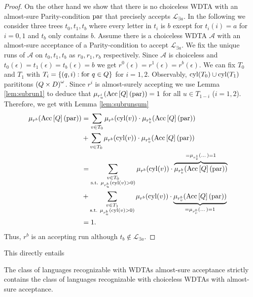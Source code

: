 \begin{proof}
  On the other hand we show that there is no choiceless \ac{WDTA} with an
  almost-sure Parity-condition $\operatorname{par}$ that precisely accepts 
  $\mathcal{L}_{\exists a}$. In the following we consider three trees 
  $t_{0}, t_{1}, t_{b}$ where every letter in $t_{i}$ is $b$ except for 
  $t_{i}(i) = a$ for $i = 0,1$ and $t_{b}$ only contains $b$. Assume there is a 
  choiceless \ac{WDTA} $\mathcal{A}$ with an almost-sure acceptance of a 
  Parity-condition to accept $\mathcal{L}_{\exists a}$. We fix the unique runs 
  of $\mathcal{A}$ on $t_{0},t_{1}, t_{b}$ as $r_{0}, r_{1}, r_{b}$ 
  respectively. Since $\mathcal{A}$ is choiceless and 
  $t_{0}(\epsilon) = t_{1}(\epsilon) = t_{b}(\epsilon) = b$ we get 
  $r^{0}(\epsilon) = r^{1}(\epsilon) = r^{b}(\epsilon)$. We can fix
  $T_{0}$ and $T_{1}$ with $T_{i} = \left\{\left(q, i\right):\text{for }q\in Q\right\}$ 
  for $i = 1,2$. Observably, $\operatorname{cyl}(T_{0})\cup\operatorname{cyl}(T_{1})$ parititons 
  $\left(Q\times D\right)^{\omega}$. Since $r^{i}$ is almost-surely accepting we use
  Lemma \ref{lem:subrun1} to deduce that 
  $\mu_{r^{i}_{u}}(\operatorname{Acc}\left[Q\right](\operatorname{par})) = 1$ for all $u\in T_{1-i}$ 
  ($i = 1,2$). Therefore, we get with Lemma \ref{lem:subrunsum}
  \begin{align*}
    \mu_{r^{b}}(\operatorname{Acc}\left[Q\right](\operatorname{par})) &= \sum_{v\in T_{0}}
      \mu_{r^{b}}(\operatorname{cyl}(v))\cdot\mu_{r^{b}_{v}}(\operatorname{Acc}\left[Q\right](\operatorname{par}))\\
    &+ \sum_{v\in T_{0}}
      \mu_{r^{b}}(\operatorname{cyl}(v))\cdot\mu_{r^{b}_{v}}(\operatorname{Acc}\left[Q\right](\operatorname{par}))\\
    &= \sum_{\substack{v\in T_{0}\\\text{s.t. }\mu_{r^{b}_{u}}(\operatorname{cyl}(v)>0)}}
      \mu_{r^{b}}(\operatorname{cyl}(v))\cdot\overbrace{\mu_{r^{b}_{v}}(
        \operatorname{Acc}\left[Q\right](\operatorname{par}))}^{=\mu_{r^{1}_{v}}(\dots)=1}\\
    &+ \sum_{\substack{v\in T_{1}\\\text{s.t. }\mu_{r^{b}_{u}}(\operatorname{cyl}(v)>0)}}
      \mu_{r^{b}}(\operatorname{cyl}(v))\cdot\underbrace{\mu_{r^{b}_{v}}(
        \operatorname{Acc}\left[Q\right](\operatorname{par}))}_{=\mu_{r^{0}_{v}}(\dots)=1}\\
    &= 1.
  \end{align*}
  Thus, $r^{b}$ is an accepting run although 
  $t_{b}\notin\mathcal{L}_{\exists a}$.
\end{proof}
This directly entails
\begin{corollary}
  The class of languages recognizable with \acp{WDTA} almost-sure acceptance
  strictly contains the class of languages recognizable with choiceless
  \acp{WDTA} with almost-sure acceptance.
\end{corollary}

